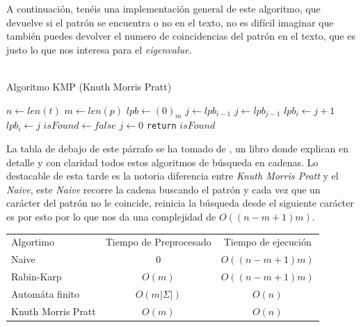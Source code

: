 A continuación, tenéis una implementación general de este algoritmo, que devuelve si el patrón se encuentra o no en el texto, no es difícil imaginar que también puedes devolver el numero de coincidencias del patrón en el texto, que es justo lo que nos interesa para el \textit{eigenvalue}.\\\\
\newpage
\begin{algorithm}
\caption{Algoritmo KMP (Knuth Morris Pratt)}\label{alg:four}
$n \gets len(t)$\;
$m \gets len(p)$\;
$lpb \gets (0)_m$\;
 {
    $j \gets lpb_{i-1}$\;
     {
        $j \gets lpb_{j-1}$\;
         {
            $lpb_i \gets j+1$\;
        }
        {
        $lpb_i \gets j$\;
        }
    }
}
$isFound \gets false$\;
$j \gets 0$\;
\texttt{return} $isFound$\;
\end{algorithm}
La tabla de debajo de este párrafo se ha tomado de \cite{leiserson2022introduction}, un libro donde explican en detalle y con claridad todos estos algoritmos de búsqueda en cadenas. Lo destacable de esta tarde es la notoria diferencia entre \textit{Knuth Morris Pratt} y el \textit{Naive}, este \textit{Naive} recorre la cadena buscando el patrón y cada vez que un carácter del patrón no le coincide, reinicia la búsqueda desde el siguiente carácter es por esto por lo que nos da una complejidad de $O((n-m+1)m)$. 
\begin{center}
\begin{tabular}{ l c c }
 Algortimo & Tiempo de Preprocesado & Tiempo de ejecución \\ \cline{1-3}
 Naive & 0 & $O((n-m+1)m)$ \\  
 Rabin-Karp & $O(m)$ & $O((n-m+1)m)$ \\
 Automáta finito & $O(m|\Sigma|)$ & $O(n)$ \\
 Knuth Morris Pratt & $O(m)$ & $O(n)$
\end{tabular}
\end{center}


